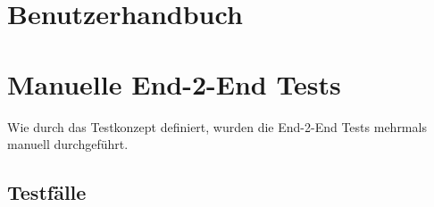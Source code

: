 \documentclass[a4paper,12pt]{report}
\begin{document}
    \clearpage


    \section{Benutzerhandbuch}
    \label{sec:user-manual}


    \section{Manuelle End-2-End Tests}
    Wie durch das Testkonzept definiert, wurden die End-2-End Tests mehrmals manuell durchgeführt.

    \subsection{Testfälle}
\end{document}
